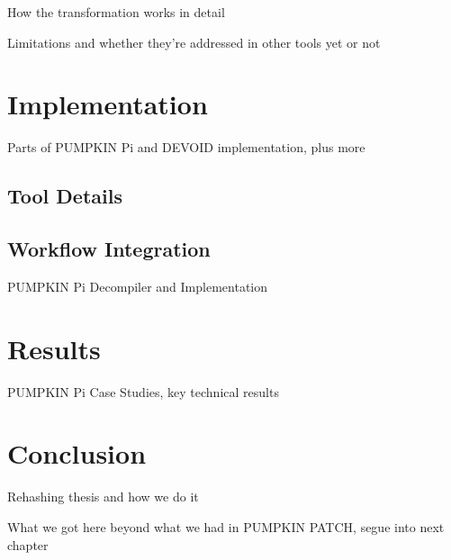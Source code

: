 How the transformation works in detail

Limitations and whether they're addressed in other tools yet or not

\section{Implementation}

Parts of PUMPKIN Pi and DEVOID implementation, plus more

\subsection{Tool Details}

\subsection{Workflow Integration}

PUMPKIN Pi Decompiler and Implementation

\section{Results}

PUMPKIN Pi Case Studies, key technical results

\section{Conclusion}

Rehashing thesis and how we do it

What we got here beyond what we had in PUMPKIN PATCH, segue into next chapter



%

%

%

%

%

%

%

%

%

%

%

%

%

%

%

%

%

